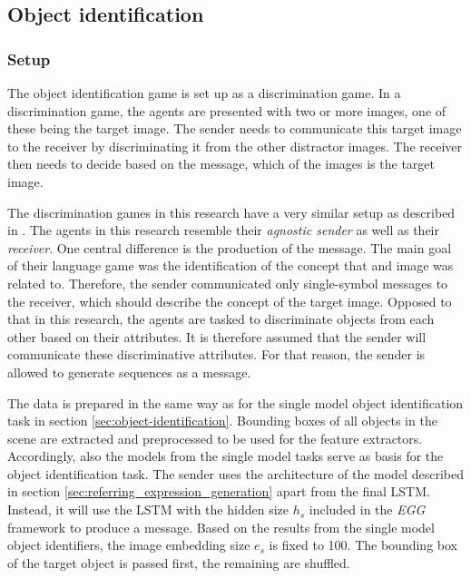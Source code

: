 \subsection{Object identification}
\subsubsection*{Setup}

The object identification game is set up as a discrimination game.
In a discrimination game, the agents are presented with two or more images, one of these being the target image.
The sender needs to communicate this target image to the receiver by discriminating it from the other distractor images.
The receiver then needs to decide based on the message, which of the images is the target image.

The discrimination games in this research have a very similar setup as described in \citep{Lazaridou2017}.
The agents in this research resemble their \emph{agnostic sender} as well as their \emph{receiver}.
One central difference is the production of the message.
The main goal of their language game was the identification of the concept that and image was related to.
Therefore, the sender communicated only single-symbol messages to the receiver, which should describe the concept of the target image.
Opposed to that in this research, the agents are tasked to discriminate objects from each other based on their attributes.
It is therefore assumed that the sender will communicate these discriminative attributes.
For that reason, the sender is allowed to generate sequences as a message.

The data is prepared in the same way as for the single model object identification task in section \ref{sec:object-identification}.
Bounding boxes of all objects in the scene are extracted and preprocessed to be used for the feature extractors.
Accordingly, also the models from the single model tasks serve as basis for the object identification task.
The sender uses the architecture of the model described in section \ref{sec:referring_expression_generation} apart from the final LSTM.
Instead, it will use the LSTM with the hidden size $h_s$ included in the \emph{EGG} framework to produce a message.
Based on the results from the single model object identifiers, the image embedding size $e_s$ is fixed to 100.
The bounding box of the target object is passed first, the remaining are shuffled.

